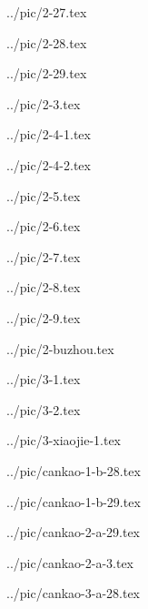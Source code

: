 

../pic/2-27.tex



../pic/2-28.tex



../pic/2-29.tex



../pic/2-3.tex



../pic/2-4-1.tex



../pic/2-4-2.tex



../pic/2-5.tex



../pic/2-6.tex



../pic/2-7.tex



../pic/2-8.tex



../pic/2-9.tex



../pic/2-buzhou.tex



../pic/3-1.tex



../pic/3-2.tex



../pic/3-xiaojie-1.tex



../pic/cankao-1-b-28.tex



../pic/cankao-1-b-29.tex



../pic/cankao-2-a-29.tex



../pic/cankao-2-a-3.tex



../pic/cankao-3-a-28.tex



